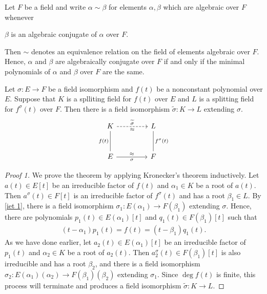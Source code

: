 \begin{prop}
    Let $F$ be a field and write $\alpha\sim\beta$ for elements $\alpha, \beta$ which are algebraic over $F$ whenever
    \begin{center}
        $\beta$ is an algebraic conjugate of $\alpha$ over $F$.
    \end{center}
    Then $\sim$ denotes an equivalence relation on the field of elements algebraic over $F$.
    Hence, $\alpha$ and $\beta$ are algebraically conjugate over $F$ if and only if the minimal polynomials of $\alpha$ and $\beta$ over $F$ are the same.
\end{prop}

\begin{thm}\label{iet 2}
    Let $\sigma: E\rightarrow F$ be a field isomorphism and $f(t)$ be a nonconstant polynomial over $E$.
    Suppose that $K$ is a splliting field for $f(t)$ over $E$ and $L$ is a splitting field for $f^\sigma(t)$ over $F$.
    Then there is a field isomorphism $\widetilde{\sigma}: K\rightarrow L$ extending $\sigma$.
    \begin{equation*}
    \begin{tikzcd}[row sep=1.0cm, column sep=1.5cm]
        K\arrow[r, "\widetilde{\sigma}", "\approx"', dashed]
        &
        L\\
        E\arrow[u, "f(t)", dash]\arrow[r, "\approx", "\sigma"']
        &
        F\arrow[u, "f^\sigma(t)"', dash]
    \end{tikzcd}
    \end{equation*}
\end{thm}
\begin{proof}[Proof 1]
    We prove the theorem by applying Kronecker's theorem inductively.
    Let $a(t)\in E[t]$ be an irreducible factor of $f(t)$ and $\alpha_1\in K$ be a root of $a(t)$.
    Then $a^\sigma(t)\in F[t]$ is an irreducible factor of $f^\sigma(t)$ and has a root $\beta_1\in L$.
    By \cref{iet 1}, there is a field isomorphism $\sigma_1: E(\alpha_1)\rightarrow F(\beta_1)$ extending $\sigma$.
    Hence, there are polynomials $p_1(t)\in E(\alpha_1)[t]$ and $q_1(t)\in F(\beta_1)[t]$ such that
    \begin{align*}
        (t-\alpha_1)p_1(t)=f(t)=(t-\beta_1)q_1(t).
    \end{align*}
    As we have done earlier, let $a_2(t)\in E(\alpha_1)[t]$ be an irreducible factor of $p_1(t)$ and $\alpha_2\in K$ be a root of $a_2(t)$.
    Then $a_2^\sigma(t)\in F(\beta_1)[t]$ is also irreducible and has a root $\beta_2$, and there is a field isomorphism $\sigma_2: E(\alpha_1)(\alpha_2)\rightarrow F(\beta_1)(\beta_2)$ extending $\sigma_1$.
    Since $\deg f(t)$ is finite, this process will terminate and produces a field isomorphism $\widetilde{\sigma}: K\rightarrow L$.
\end{proof}
